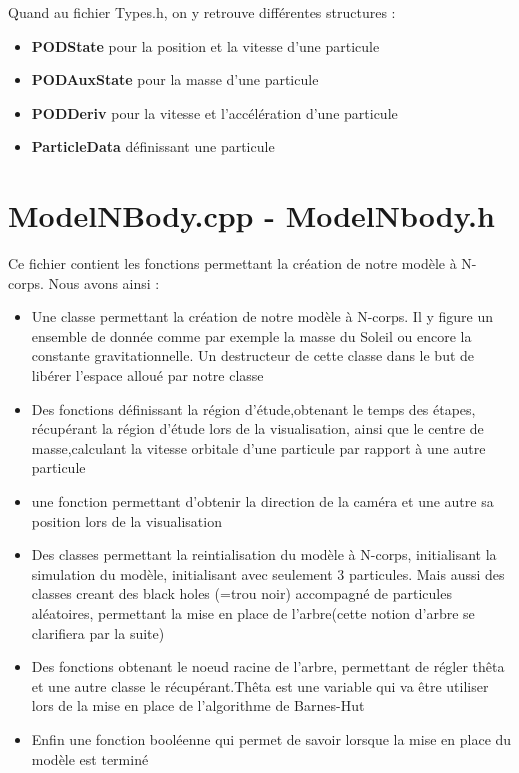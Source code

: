 Quand au fichier Types.h, on y retrouve différentes structures :
\begin{itemize}
    \item \textbf{PODState} pour la position et la vitesse d'une particule
    \item \textbf{PODAuxState} pour la masse d'une particule
    \item \textbf{PODDeriv} pour la vitesse et l'accélération d'une particule
    \item \textbf{ParticleData} définissant une particule

\end{itemize}
\newpage
\section{ModelNBody.cpp - ModelNbody.h}
Ce fichier contient les fonctions permettant la création de notre modèle à N-corps. Nous avons ainsi :
\newline
\begin{itemize}
    \item Une classe permettant la création de notre modèle à N-corps. Il y figure un ensemble de donnée comme par exemple la masse du Soleil ou encore la constante gravitationnelle. Un destructeur de cette classe dans le but de libérer l'espace alloué par notre classe
    \item Des fonctions définissant la région d'étude,obtenant le temps des étapes, récupérant la région d'étude lors de la visualisation, ainsi que le centre de masse,calculant la vitesse orbitale d'une particule par rapport à une autre particule
    \item une fonction permettant d'obtenir la direction de la caméra et une autre sa position lors de la visualisation
    \item Des classes permettant la reintialisation du modèle à N-corps, initialisant la simulation du modèle, initialisant avec seulement 3 particules. Mais aussi des classes creant des black holes (=trou noir) accompagné de particules aléatoires, permettant la mise en place de l'arbre(cette notion d'arbre se clarifiera par la suite)
    \item Des fonctions obtenant le noeud racine de l'arbre, permettant de régler thêta et une autre classe le récupérant.Thêta est une variable qui va être utiliser lors de la mise en place de l'algorithme de Barnes-Hut
    \item Enfin une fonction booléenne qui permet de savoir lorsque la mise en place du modèle est terminé
\end{itemize}

